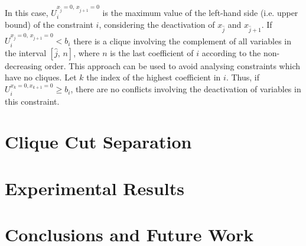 \documentclass{endm}
\begin{document}
\noindent In this case, $U_{i}^{x_{\hat{j}} = 0,\, x_{\hat{j}+1} = 0}$ is the maximum value of the left-hand side (i.e. upper bound) of the constraint $i$, considering the deactivation of $x_{\hat{j}}$ and $x_{\hat{j}+1}$. If $U_{i}^{x_{\hat{j}} = 0,\, x_{\hat{j}+1} = 0} < b_i$ there is a clique involving the complement of all variables in the interval $[\hat{j},\, n]$, where $n$ is the last coefficient of $i$ according to the non-decreasing order. This approach can be used to avoid analysing constraints which have no cliques. Let $k$ the index of the highest coefficient in $i$. Thus, if $U_{i}^{x_{k}=0,x_{k+1}=0}\geq b_{i}$, there are no conflicts involving the deactivation of variables in this constraint.













\section{Clique Cut Separation}\label{cut}
\section{Experimental Results}\label{experiments}
\section{Conclusions and Future Work}\label{conclusions}



\end{document}
